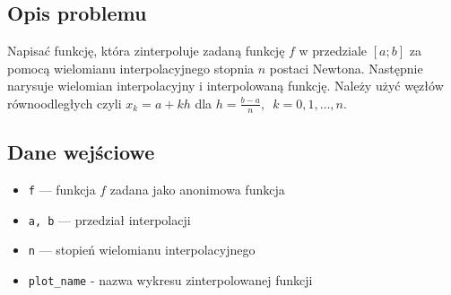 \documentclass{article}
\begin{document}
\subsection*{Opis problemu}
	Napisać funkcję, która zinterpoluje zadaną funkcję $f$ w przedziale $[a;b]$ za pomocą wielomianu interpolacyjnego stopnia $n$ postaci Newtona. Następnie narysuje wielomian interpolacyjny i interpolowaną funkcję. Należy użyć węzłów równoodległych czyli $x_k = a + kh$ dla $h = \frac{b-a}{n}, \enspace k = 0,1,\dots,n$.
\subsection*{Dane wejściowe}
	\begin{itemize}
	    \item \texttt{f} — funkcja $f$ zadana jako anonimowa funkcja
	    \item \texttt{a, b} — przedział interpolacji
	    \item \texttt{n} — stopień wielomianu interpolacyjnego
	    \item \texttt{plot\_name} - nazwa wykresu zinterpolowanej funkcji
	\end{itemize}
\end{document}
